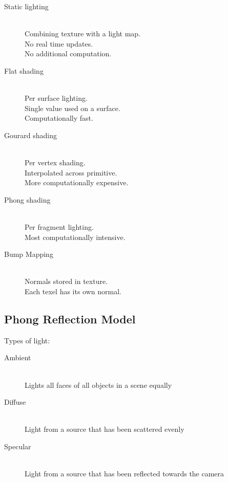 \documentclass[a4paper]{article}
\begin{document}
\begin{description}
  \item[Static lighting] \hfill \\
    Combining texture with a light map. \\
    No real time updates. \\
    No additional computation.

  \item[Flat shading] \hfill \\
    Per surface lighting. \\
    Single value used on a surface. \\
    Computationally fast.

  \item[Gourard shading] \hfill \\
    Per vertex shading. \\
    Interpolated across primitive. \\
    More computationally expensive.

  \item[Phong shading] \hfill \\
    Per fragment lighting. \\
    Most computationally intensive.

  \item[Bump Mapping] \hfill \\
    Normals stored in texture. \\
    Each texel has its own normal.

\end{description}

\subsection{Phong Reflection Model}

Types of light:

\begin{description}
  \item[Ambient] \hfill \\
    Lights all faces of all objects in a scene equally
  \item[Diffuse] \hfill \\
    Light from a source that has been scattered evenly
  \item[Specular] \hfill \\
    Light from a source that has been reflected towards the camera
\end{description}
\end{document}
